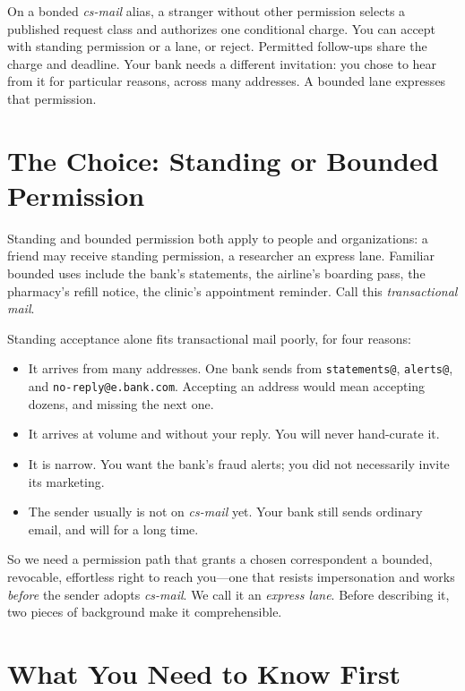 \documentclass[11pt]{article}
\begin{document}
On a bonded \textit{cs-mail} alias, a stranger without other permission
selects a published request class and authorizes one conditional charge. You can
accept with standing permission or a lane, or
reject. Permitted follow-ups share the charge and deadline. Your bank needs a
different invitation: you chose to hear from it for particular reasons, across
many addresses. A bounded lane expresses that permission.

\section{The Choice: Standing or Bounded Permission}

Standing and bounded permission both apply to people and organizations: a friend
may receive standing permission, a researcher an express lane. Familiar bounded
uses include the bank's
statements, the airline's boarding pass, the pharmacy's refill notice, the clinic's
appointment reminder. Call this \emph{transactional mail}.

Standing acceptance alone fits transactional mail poorly, for four reasons:

\begin{itemize}[leftmargin=2em]
    \item It arrives from many addresses. One bank sends from
    \texttt{statements@}, \texttt{alerts@}, and
    \texttt{no-\allowbreak reply@\allowbreak e.bank.com}.
    Accepting an address would mean accepting dozens, and missing the next one.
    \item It arrives at volume and without your reply. You will never hand-curate
    it.
    \item It is narrow. You want the bank's fraud alerts; you did not necessarily
    invite its marketing.
    \item The sender usually is not on \textit{cs-mail} yet. Your bank still sends
    ordinary email, and will for a long time.
\end{itemize}

So we need a permission path that grants a chosen correspondent a
bounded, revocable, effortless right to reach you---one that resists
impersonation and works \emph{before} the sender adopts \textit{cs-mail}. We call
it an \emph{express lane}. Before describing it, two pieces of background make it
comprehensible.

\section{What You Need to Know First}
\end{document}
